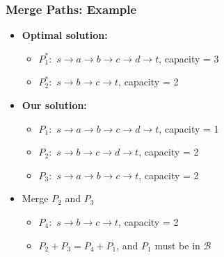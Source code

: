 \frame
{
	\frametitle{Merge Paths: Example}
	\vspace{0.8cm}
	
	\vspace{0.5cm}
	\begin{itemize}
	\item {\bf Optimal solution:} 
		\begin{itemize}
		\item $P_1^*:$ $s\to a\to b\to c\to d\to t$, capacity = 3
		\item $P_2^*:$  $s\to b\to c\to t$, capacity = 2
		\end{itemize}
	\vspace{0.2cm}
	\item {\bf Our solution:} 
		\begin{itemize}
		\item $P_1:$ $s\to a\to b\to c\to d\to t$, capacity = 1
		\item $P_2:$  $s\to b\to c\to d\to t$, capacity = 2
		\item $P_3:$  $s\to a\to b\to c\to t$, capacity = 2
		\end{itemize}
	\vspace{0.2cm}
	\item Merge $P_2$ and $P_3$ 
		\begin{itemize}
		\item $P_4:$ $s\to b\to c\to t$, capacity = 2
		\item $P_2 + P_3 = P_4 + P_1$, and $P_1$ must be in $\mathcal{B}$
		\end{itemize}
	\end{itemize}

}

